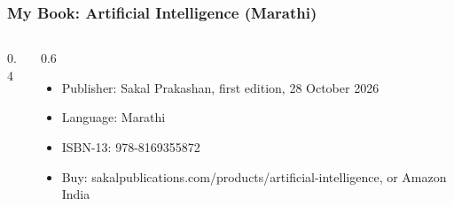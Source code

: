 
\begin{frame}[fragile]\frametitle{My Book: Artificial Intelligence (Marathi)}
\begin{columns}
    \begin{column}[T]{0.4\linewidth}
		\begin{center}
		\end{center}
    \end{column}
    \begin{column}[T]{0.6\linewidth}
		\begin{itemize}
		\item Publisher: Sakal Prakashan, first edition, 28 October 2026
		\item Language: Marathi
		\item ISBN-13: 978-8169355872
		\item Buy: sakalpublications.com/products/artificial-intelligence, or Amazon India
		\end{itemize}
		\begin{center}
		\hfill{}
		\end{center}
    \end{column}
\end{columns}
\end{frame}
